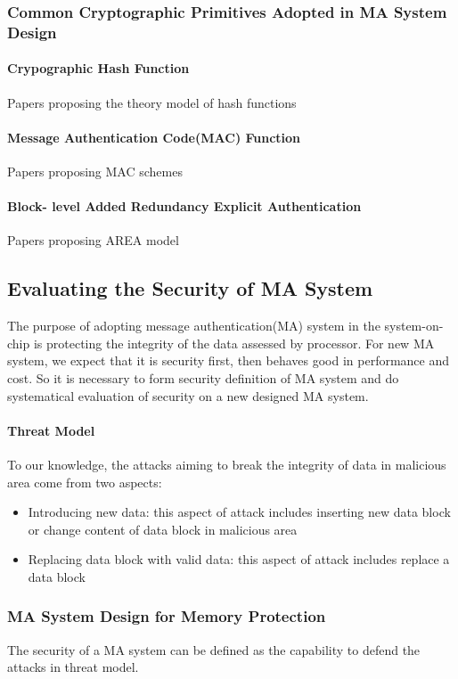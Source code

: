 \documentclass{article}
\begin{document}
\subsubsection{Common Cryptographic Primitives Adopted in MA System Design}
\paragraph{Crypographic Hash Function}
Papers proposing the theory model of hash functions
\paragraph{Message Authentication Code(MAC) Function}
Papers proposing MAC schemes
\paragraph{Block- level Added Redundancy Explicit Authentication}
Papers proposing AREA model

\subsection{Evaluating the Security of MA System}
The purpose of adopting message authentication(MA) system in the system-on-chip is protecting the integrity of the data assessed by processor. 
For new MA system, we expect that it is security first, then behaves good in performance and cost. So it is necessary to form security definition of MA system and do systematical evaluation of security on a new designed MA system.
\paragraph{Threat Model}
To our knowledge, the attacks aiming to break the integrity of data in malicious area come from two aspects:
\begin{itemize}
	\item Introducing new data: this aspect of attack includes inserting new data block or change content of data block in malicious area
	\item Replacing data block with valid data: this aspect of attack includes replace a data block 
\end{itemize}
\subsubsection{MA System Design for Memory Protection}
The security of a MA system can be defined as the capability to defend the attacks in threat model. 
\end{document}
